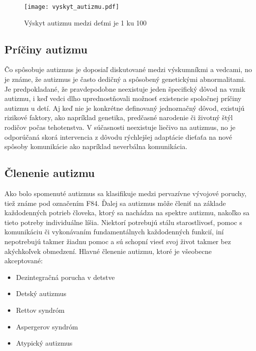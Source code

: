 \documentclass[10pt,twoside,slovak,a4paper]{coursepaper}
\begin{document}
\begin{figure*}[tbh]
\centering
\texttt{[image: vyskyt\_autizmu.pdf]}
\caption{Výskyt autizmu medzi deťmi je 1 ku 100\cite{Autism_prevelance}}
\label{f:rozhod}
\end{figure*}



\subsection{Príčiny autizmu}
	Čo spôsobuje autizmus je doposiaľ diskutované medzi výskumníkmi a vedcami, no je známe, že autizmus je často dedičný a spôsobený genetickými abnormalitami. Je predpokladané, že pravdepodobne neexistuje jeden špecifický dôvod na vznik autizmu, i keď vedci dlho uprednostňovali možnosť existencie spoločnej príčiny autizmu u detí. Aj keď nie je konkrétne definovaný jednoznačný dôvod, existujú rizikové faktory, ako napríklad genetika, predčasné narodenie či životný štýl rodičov počas tehotenstva. V súčasnosti neexistuje liečivo na autizmus, no je odporúčaná skorá intervencia z dôvodu rýchlejšej adaptácie dieťaťa na nové spôsoby komunikácie ako napríklad neverbálna komunikácia. 


\subsection{Členenie autizmu}
Ako bolo spomenuté autizmus sa klasifikuje medzi pervazívne vývojové poruchy, tiež známe pod označením F84. Ďalej sa autizmus môže členiť na základe každodenných potrieb človeka, ktorý sa nachádza na spektre autizmu, nakoľko sa tieto potreby individuálne líšia. Niektorí potrebujú stálu starostlivosť, pomoc s komunikáciu či vykonávaním fundamentálnych každodenných funkcií, iní nepotrebujú takmer žiadnu pomoc a sú schopní viesť svoj život takmer bez akýchkoľvek obmedzení. Hlavné členenie autizmu, ktoré je všeobecne akceptované\cite{Autism_diagnosis}:  

\begin{itemize}
\item Dezintegračná porucha v detstve
\item Detský autizmus
\item Rettov syndróm
\item Aspergerov syndróm 
\item Atypický autizmus
\end{itemize}
\end{document}
